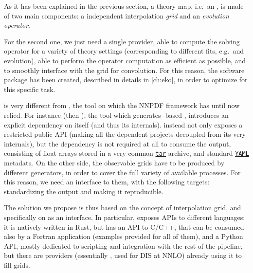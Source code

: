 
As it has been explained in the previous section, a theory map, i.e.\ an
\fktab, is made of two main components: a \pdf independent interpolation
\textit{grid} and an \textit{evolution operator}.

For the second one, we just need a single provider, able to compute the \dglap
solving operator for a variety of theory settings (corresponding to different
\pdf fits, e.g.\ \nlo and \nnlo \qcd evolution), able to perform the
operator computation as efficient as possible, and to smoothly interface with
the grid for convolution.
For this reason, the software package \eko \cite{Candido:2022tld} has been
created, described in details in \cref{ch:eko}, in order to optimize for this
specific task.

\eko is very different from \apfel, the tool on which the NNPDF framework has
until now relied. For instance \apfelgrid (then \apfelcomb), the tool which
generates \apfel-based \fktab, introduces an explicit dependency on \apfel
itself (and thus its internals).
\eko instead not only exposes a restricted public API (making all the dependent
projects decoupled from its very internals), but the dependency is not required
at all to consume the \eko output, consisting of float arrays stored in a very
common \href{https://en.wikipedia.org/wiki/Tar\_(computing)}{\texttt{tar}}
archive, and standard \href{https://yaml.org/}{\texttt{YAML}} metadata.
On the other side, the observable grids have to be produced by different
generators, in order to cover the full variety of available processes.
For this reason, we need an interface to them, with the following targets:
standardizing the output and making it reproducible.

The solution we propose is thus based on the concept of interpolation grid, and
specifically on \pineappl as an interface.
In particular, \pineappl exposes APIs to different languages: it is natively
written in Rust, but has an API to C/C++, that can be consumed also by a
Fortran application (examples provided for all of them), and a Python API,
mostly dedicated to scripting and integration with the rest of the pipeline,
but there are providers (essentially \yadism
\cite{candido_alessandro_2022_6285149}, used for DIS at NNLO) already using it
to fill grids.

